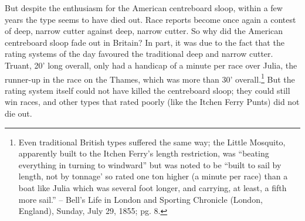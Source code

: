 \documentclass[
  letterpaper,
]{scrbook}
\begin{document}
But despite the enthusiasm for the American centreboard sloop, within a
few years the type seems to have died out. Race reports become once
again a contest of deep, narrow cutter against deep, narrow cutter. So
why did the American centreboard sloop fade out in Britain? In part, it
was due to the fact that the rating systems of the day favoured the
traditional deep and narrow cutter. Truant, 20' long overall, only had a
handicap of a minute per race over Julia, the runner-up in the race on
the Thames, which was more than 30' overall.\footnote{Even traditional
  British types suffered the same way; the Little Mosquito, apparently
  built to the Itchen Ferry's length restriction, was ``beating
  everything in turning to windward'' but was noted to be ``built to
  sail by length, not by tonnage' so rated one ton higher (a minute per
  race) than a boat like Julia which was several foot longer, and
  carrying, at least, a fifth more sail.'' -- Bell's Life in London and
  Sporting Chronicle (London, England), Sunday, July 29, 1855; pg. 8.}
But the rating system itself could not have killed the centreboard
sloop; they could still win races, and other types that rated poorly
(like the Itchen Ferry Punts) did not die out.
\end{document}

